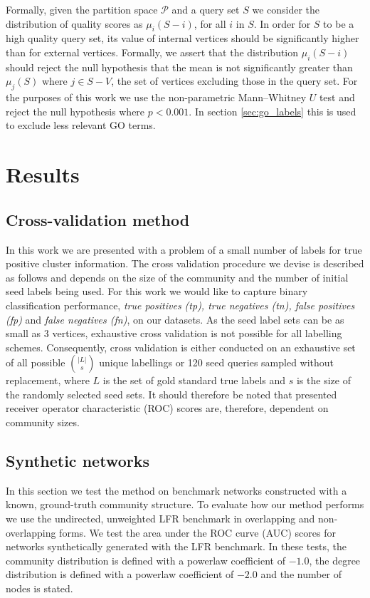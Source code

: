 \documentclass[sigconf]{acmart}
\begin{document}
Formally, given the partition space $\mathcal{P}$ and a query set $S$ we consider the distribution of quality scores as $\mu_i(S - i)$, for all $i$ in $S$.
In order for $S$ to be a high quality query set, its value of internal vertices should be significantly higher than for external vertices.
Formally, we assert that the distribution $\mu_i(S - i)$ should reject the null hypothesis that the mean is not significantly greater than $\mu_j(S)$ where $j \in S - V$, the set of vertices excluding those in the query set.
For the purposes of this work we use the non-parametric Mann–Whitney $U$ test and reject the null hypothesis where $p < 0.001$.
In section \ref{sec:go_labels} this is used to exclude less relevant GO terms.

\section{Results}
\subsection{Cross-validation method}
\label{sec:cross_validation}
In this work we are presented with a problem of a small number of labels for true positive cluster information.
The cross validation procedure we devise is described as follows and depends on the size of the community and the number of initial seed labels being used.
For this work we would like to capture binary classification  performance, \textit{true positives (tp), true negatives (tn), false positives (fp)} and \textit{false negatives (fn)}, on our datasets.
As the seed label sets can be as small as 3 vertices, exhaustive cross validation is not possible for all labelling schemes.
Consequently, cross validation is either conducted on an exhaustive set of all possible $\binom{|L|}{s}$ unique labellings or 120 seed queries sampled without replacement, where $L$ is the set of gold standard true labels and $s$ is the size of the randomly selected seed sets.
It should therefore be noted that presented receiver operator characteristic (ROC) scores are, therefore, dependent on community sizes.

\subsection{Synthetic networks}
In this section we test the method on benchmark networks constructed with a known, ground-truth community structure.
To evaluate how our method performs we use the undirected, unweighted LFR benchmark \cite{lancichinetti2008benchmark} in overlapping and non-overlapping forms.
We test the area under the ROC curve (AUC) scores for networks synthetically generated with the LFR benchmark.
In these tests, the community distribution is defined with a powerlaw coefficient of $-1.0$, the degree distribution is defined with a powerlaw coefficient of $-2.0$ and the number of nodes is stated.
\end{document}
